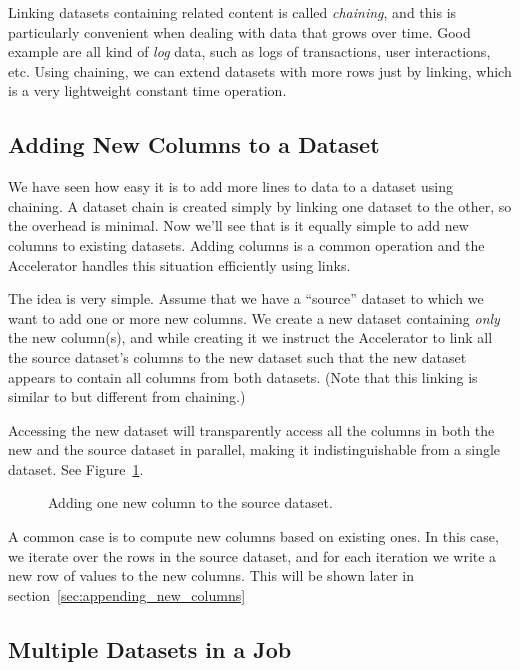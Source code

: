 Linking datasets containing related content is called \emph{chaining},
and this is particularly convenient when dealing with data that grows
over time.  Good example are all kind of \emph{log} data, such as logs
of transactions, user interactions, etc.  Using chaining, we can
extend datasets with more rows just by linking, which is a very
lightweight constant time operation.



\subsection{Adding New Columns to a Dataset}
We have seen how easy it is to add more lines to data to a dataset
using chaining.  A dataset chain is created simply by linking one
dataset to the other, so the overhead is minimal.  Now we'll see that
is it equally simple to add new columns to existing datasets.  Adding
columns is a common operation and the Accelerator handles this
situation efficiently using links.

The idea is very simple.  Assume that we have a ``source'' dataset to
which we want to add one or more new columns.  We create a new dataset
containing \textsl{only} the new column(s), and while creating it we
instruct the Accelerator to link all the source dataset's columns to
the new dataset such that the new dataset appears to contain all
columns from both datasets.  (Note that this linking is similar to but
different from chaining.)

Accessing the new dataset will transparently access all the columns in
both the new and the source dataset in parallel, making it
indistinguishable from a single dataset.  See
Figure~\ref{fig:dep_dataset_append_column}.

\begin{figure}[h!]
  \begin{center}
    
    \caption{Adding one new column to the source dataset.}
    \label{fig:dep_dataset_append_column}
  \end{center}
\end{figure}

A common case is to compute new columns based on existing ones.  In
this case, we iterate over the rows in the source dataset, and for
each iteration we write a new row of values to the new columns.  This
will be shown later in section~\ref{sec:appending_new_columns}



\subsection{Multiple Datasets in a Job}

